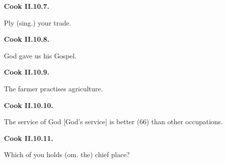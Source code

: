 \par\begin{minipage}{\linewidth}\raggedright
\textbf{Cook II.10.7.}

Ply (sing.) your trade.

\end{minipage}\par\addvspace{4pt}

\par\begin{minipage}{\linewidth}\raggedright
\textbf{Cook II.10.8.}

God gave us his Gospel.

\end{minipage}\par\addvspace{4pt}

\par\begin{minipage}{\linewidth}\raggedright
\textbf{Cook II.10.9.}

The farmer practises agriculture.

\end{minipage}\par\addvspace{4pt}

\par\begin{minipage}{\linewidth}\raggedright
\textbf{Cook II.10.10.}

The service of God [God’s service] is better (66) than other occupations.

\end{minipage}\par\addvspace{4pt}

\par\begin{minipage}{\linewidth}\raggedright
\textbf{Cook II.10.11.}

Which of you holds (om. the) chief place?

\end{minipage}\par\addvspace{4pt}

